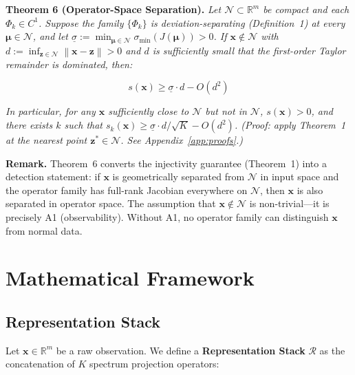 \documentclass[journal]{IEEEtran}
\newcommand{\R}{\mathbb{R}}
\newcommand{\calR}{\mathcal{R}}
\newcommand{\norm}[1]{\left\lVert#1\right\rVert}
\begin{document}
\textbf{Theorem 6 (Operator-Space Separation).} \textit{Let $\mathcal{N} \subset \R^m$ be compact and each $\Phi_k \in C^1$.  Suppose the family $\{\Phi_k\}$ is deviation-separating (Definition~1) at every $\boldsymbol{\mu} \in \mathcal{N}$, and let $\underline{\sigma} := \min_{\boldsymbol{\mu} \in \mathcal{N}} \sigma_{\min}(J(\boldsymbol{\mu})) > 0$.  If $\mathbf{x} \notin \mathcal{N}$ with $d := \inf_{\mathbf{z} \in \mathcal{N}}\norm{\mathbf{x} - \mathbf{z}} > 0$ and $d$ is sufficiently small that the first-order Taylor remainder is dominated, then:}

\begin{equation}
s(\mathbf{x}) \geq \underline{\sigma} \cdot d - O(d^2)
\label{eq:separation}
\end{equation}

\textit{In particular, for any $\mathbf{x}$ sufficiently close to $\mathcal{N}$ but not in $\mathcal{N}$, $s(\mathbf{x}) > 0$, and there exists $k$ such that $s_k(\mathbf{x}) \geq \underline{\sigma} \cdot d / \sqrt{K} - O(d^2)$.  (Proof: apply Theorem~1 at the nearest point $\mathbf{z}^* \in \mathcal{N}$.  See Appendix~\ref{app:proofs}.)}

\textbf{Remark.} Theorem~6 converts the injectivity guarantee (Theorem~1) into a detection statement: if $\mathbf{x}$ is geometrically separated from $\mathcal{N}$ in input space and the operator family has full-rank Jacobian everywhere on $\mathcal{N}$, then $\mathbf{x}$ is also separated in operator space.  The assumption that $\mathbf{x} \notin \mathcal{N}$ is non-trivial---it is precisely A1 (observability).  Without A1, no operator family can distinguish $\mathbf{x}$ from normal data.


\section{Mathematical Framework}
\label{sec:framework}

\subsection{Representation Stack}
\label{ssec:stack}

Let $\mathbf{x} \in \R^m$ be a raw observation. We define a \textbf{Representation Stack} $\calR$ as the concatenation of $K$ spectrum projection operators:
\end{document}
